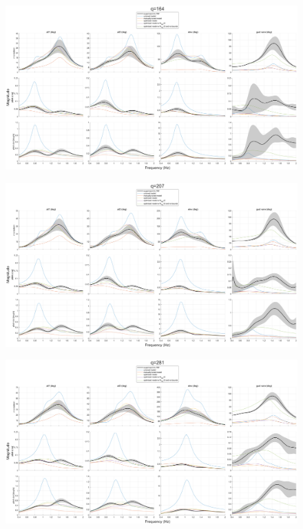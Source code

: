\begin{landscape}
\begin{figure}[H]
    \centering
    \includegraphics[width=9in]{figs/optFRFplot/FRFCOMPARE_MODEL_COMPARISON_q164.png} 
    \label{fig:optFRFplot_q164}
\end{figure}

\begin{figure}[H]
    \centering
    \includegraphics[width=9in]{figs/optFRFplot/FRFCOMPARE_MODEL_COMPARISON_q207.png} 
    \label{fig:optFRFplot_q207}
\end{figure}

\begin{figure}[H]
    \centering
    \includegraphics[width=9in]{figs/optFRFplot/FRFCOMPARE_MODEL_COMPARISON_q281.png} 
    \label{fig:optFRFplot_q281}
\end{figure}


\end{landscape}
